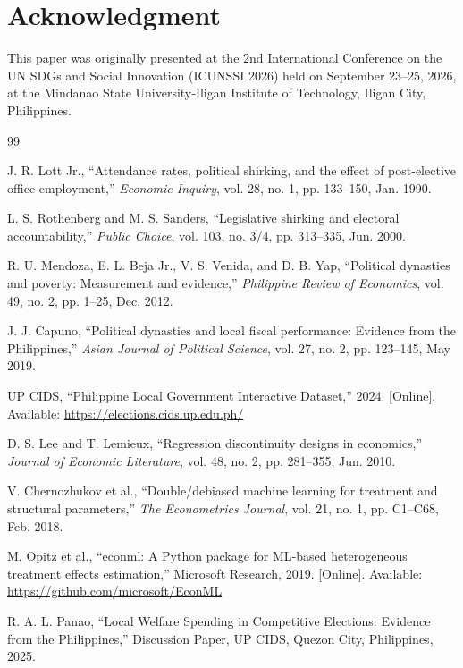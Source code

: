 \documentclass[conference]{IEEEtran}
\begin{document}
\section*{Acknowledgment}
This paper was originally presented at the 2nd International Conference on the UN SDGs and Social Innovation (ICUNSSI 2026) held on September 23–25, 2026, at the Mindanao State University‑Iligan Institute of Technology, Iligan City, Philippines.

\begin{thebibliography}{99}

 J. R. Lott Jr., ``Attendance rates, political shirking, and the effect of post-elective office employment,'' \textit{Economic Inquiry}, vol. 28, no. 1, pp. 133–150, Jan. 1990.

 L. S. Rothenberg and M. S. Sanders, ``Legislative shirking and electoral accountability,'' \textit{Public Choice}, vol. 103, no. 3/4, pp. 313–335, Jun. 2000.

 R. U. Mendoza, E. L. Beja Jr., V. S. Venida, and D. B. Yap, ``Political dynasties and poverty: Measurement and evidence,'' \textit{Philippine Review of Economics}, vol. 49, no. 2, pp. 1–25, Dec. 2012.

 J. J. Capuno, ``Political dynasties and local fiscal performance: Evidence from the Philippines,'' \textit{Asian Journal of Political Science}, vol. 27, no. 2, pp. 123–145, May 2019.

 UP CIDS, ``Philippine Local Government Interactive Dataset,'' 2024. [Online]. Available: \url{https://elections.cids.up.edu.ph/}

 D. S. Lee and T. Lemieux, ``Regression discontinuity designs in economics,'' \textit{Journal of Economic Literature}, vol. 48, no. 2, pp. 281–355, Jun. 2010.

 V. Chernozhukov et al., ``Double/debiased machine learning for treatment and structural parameters,'' \textit{The Econometrics Journal}, vol. 21, no. 1, pp. C1–C68, Feb. 2018.

 M. Opitz et al., ``econml: A Python package for ML‑based heterogeneous treatment effects estimation,'' Microsoft Research, 2019. [Online]. Available: \url{https://github.com/microsoft/EconML}

 R. A. L. Panao, ``Local Welfare Spending in Competitive Elections: Evidence from the Philippines,'' Discussion Paper, UP CIDS, Quezon City, Philippines, 2025.

\end{thebibliography}
\end{document}
